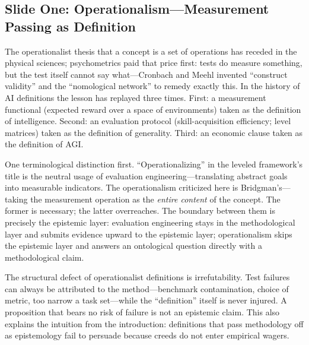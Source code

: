 \documentclass[10pt]{article}
\begin{document}
\subsection{Slide One: Operationalism---Measurement Passing as Definition}

The operationalist thesis that a concept is a set of operations\cite{bridgman1927logic} has receded in the physical sciences; psychometrics paid that price first: tests do measure something, but the test itself cannot say what---Cronbach and Meehl invented ``construct validity'' and the ``nomological network'' to remedy exactly this\cite{cronbach1955construct}. In the history of AI definitions the lesson has replayed three times. First: a measurement functional (expected reward over a space of environments) taken as the definition of intelligence\cite{legg2007universal}. Second: an evaluation protocol (skill-acquisition efficiency; level matrices) taken as the definition of generality\cite{chollet2019measure,morris2023levels}. Third: an economic clause taken as the definition of AGI\cite{openai2018charter}.

One terminological distinction first. ``Operationalizing'' in the leveled framework's title\cite{morris2023levels} is the neutral usage of evaluation engineering---translating abstract goals into measurable indicators. The operationalism criticized here is Bridgman's---taking the measurement operation as the \emph{entire content} of the concept. The former is necessary; the latter overreaches. The boundary between them is precisely the epistemic layer: evaluation engineering stays in the methodological layer and submits evidence upward to the epistemic layer; operationalism skips the epistemic layer and answers an ontological question directly with a methodological claim.

The structural defect of operationalist definitions is irrefutability. Test failures can always be attributed to the method---benchmark contamination\cite{zhang2024gsm1k}, choice of metric\cite{schaeffer2023mirage}, too narrow a task set---while the ``definition'' itself is never injured. A proposition that bears no risk of failure is not an epistemic claim. This also explains the intuition from the introduction: definitions that pass methodology off as epistemology fail to persuade because creeds do not enter empirical wagers.
\end{document}
